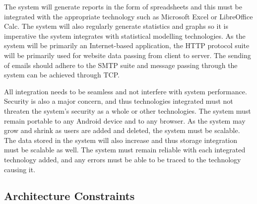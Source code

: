 \documentclass[a4paper,12pt]{article}
\begin{document}
The system will generate reports in the form of spreadsheets and this must be integrated with the appropriate technology such as Microsoft Excel or LibreOffice Calc. The system will also regularly generate statistics and graphs so it is imperative the system integrates with statistical modelling technologies. As the system will be primarily an Internet-based application, the HTTP protocol suite will be primarily used for website data passing from client to server. The sending of emails should adhere to the SMTP suite and message passing through the system can be achieved through TCP. 

All integration needs to be seamless and not interfere with system performance. Security is also a major concern, and thus technologies integrated must not threaten the system's security as a whole or other technologies. The system must remain portable to any Android device and to any browser. As the system may grow and shrink as users are added and deleted, the system must be scalable. The data stored in the system will also increase and thus storage integration must be scalable as well. The system must remain reliable with each integrated technology added, and any errors must be able to be traced to the technology causing it.

\newpage
\subsection{Architecture Constraints}
\end{document}
